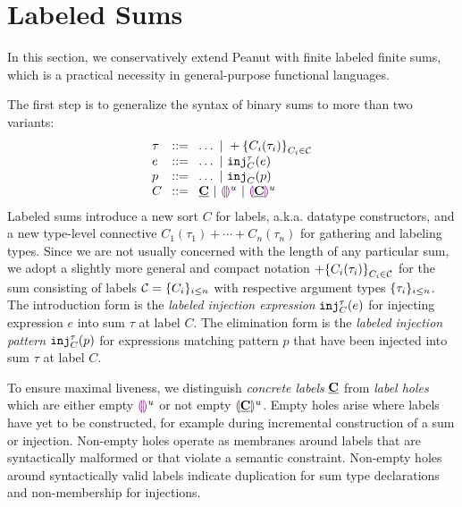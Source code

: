 \section{Labeled Sums}\label{sec:labeledsums}

In this section, we conservatively extend Peanut with finite labeled finite sums, which is a practical necessity in general-purpose functional languages.

The first step is to generalize the syntax of binary sums to more than two variants:
\[
  \arraycolsep=4pt\begin{array}{lll}
    \tau & ::= & \ldots ~\vert~ \tlabeledsum{C_i(\tau_i)}_{C_i \in \tagset} \\
    e    & ::= & \ldots ~\vert~ \hinj{C}{\tau}{e}                           \\
    p    & ::= & \ldots ~\vert~ \hinjp{C}{p}                                \\
    C    & ::= & \tagC ~\vert~ \tagehole{u} ~\vert~ \taghole{\tagC}{u}
  \end{array}
\]
Labeled sums introduce a new sort $C$ for labels, a.k.a. datatype constructors, and a new type-level connective $C_1(\tau_1) + \cdots + C_n(\tau_n)$ for gathering and labeling types.
Since we are not usually concerned with the length of any particular sum,
we adopt a slightly more general and compact notation $+\mathopen{}\left\{C_i(\tau_i)\right\}_{C_i \in \mathcal{C}}$
for the sum consisting of labels $\mathcal{C} = \{C_i\}_{i \leq n}$ with respective argument types $\{\tau_i\}_{i \leq n}$.
The introduction form is the \emph{labeled injection expression} $\mathtt{inj}_{C}^{\tau}({e})$ for injecting expression $e$ into sum $\tau$ at label $C$.
The elimination form is the \emph{labeled injection pattern} $\mathtt{inj}_{C}^{\tau}({p})$ 
for expressions matching pattern $p$ that have been injected into sum $\tau$ at label $C$.

To ensure maximal liveness, we distinguish \emph{concrete labels} $\underline{\mathbf{C}}$
from \emph{label holes} which are either empty $\textcolor{violet}{\llparenthesis}\textcolor{violet}{\rrparenthesis}^{u}$ or not empty $\textcolor{violet}{\llparenthesis}\underline{\mathbf{C}}\textcolor{violet}{\rrparenthesis}^{u}$.
Empty holes arise where labels have yet to be constructed, for example during incremental construction of a sum or injection.
Non-empty holes operate as membranes around labels that are syntactically malformed or that violate a semantic constraint.
Non-empty holes around syntactically valid labels indicate duplication for sum type declarations and non-membership for injections.

